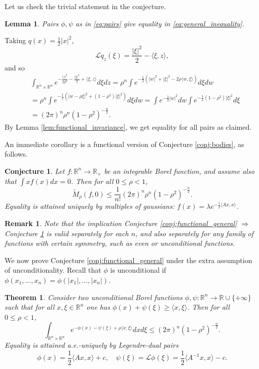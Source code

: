 \documentclass[reqno,10pt]{amsart}
\newcounter{mp}
\newtheorem{Lemma}[Proposition]{Lemma}
\newtheorem{Theorem}[Proposition]{Theorem}
\newtheorem{Remark}[Proposition]{Remark}
\newtheorem{Conjecture}[Proposition]{Conjecture}
\newcommand{\R}{\mathbb{R}}
\begin{document}
Let us check the trivial statement in the conjecture. 
\begin{Lemma}
	Pairs $\phi,\psi$ as in \eqref{eq:pairs} give equality in \eqref{eq:general_inequality}.
\end{Lemma}
\proof 
Taking $q(x)=\frac12 |x|^2$, $$\mathcal Lq_z(\xi)=\frac{|\xi|^2}{2}-\langle \xi,z\rangle,$$ 
and so
\begin{align*}
&\int_{\R^n\times\R^n} e^{-\frac{|z|^2}{2\rho^2}-\frac{|\xi|^2}{2}+\langle \xi, z\rangle}d\xi dz=\rho^n\int e^{-\frac12 (|w|^2+|\xi|^2-2\rho\langle w,\xi\rangle )}d\xi dw
	\\&=\rho^n\int e^{-\frac12 (|w-\rho\xi|^2+(1-\rho^2)|\xi|^2)}d\xi dw =\int e^{-\frac12 |w|^2}dw\int e^{-\frac12 (1-\rho^2)|\xi|^2} d\xi \\&=(2\pi)^n\rho^n(1-\rho^2)^{-\frac{n}{2}}.
\end{align*}
By Lemma \ref{lem:functional_invariance}, we get equality for all pairs as claimed.

\endproof
An immediate corollary is a functional version of Conjecture \ref{conj:bodies}, as follows.
\begin{Conjecture}\label{conj:functional_santalo}
		Let $f:\R^n\to \R_+$ be an integrable Borel function, and assume also that $\int x f(x)dx=0$. Then for all $0\leq \rho<1$,
		\[ \widetilde M_\rho(f,0)\leq \frac{1}{n!}(2\pi)^n\rho^n(1-\rho^2)^{-\frac n 2}. \]
		Equality is attained uniquely by multiples of gaussians: $f(x)=\lambda e^{-\frac 12 \langle Ax, x\rangle}$.
\end{Conjecture}
\begin{Remark}
Note that the implication Conjecture \ref{conj:functional_general} $\Rightarrow$ Conjecture \ref{conj:functional_santalo} is valid separately for each $n$, and also separately for any family of functions with certain symmetry, such as even or unconditional functions.
\end{Remark}

We now prove Conjecture \ref{conj:functional_general} under the extra assumption of unconditionality. Recall that $\phi$ is unconditional if $\phi(x_1,\dots, x_n)=\phi(|x_1|,\dots, |x_n|)$.

\begin{Theorem}\label{thm:functional_unconditional}
	Consider two unconditional Borel functions $\phi,\psi:\R^n\to \R\cup\{+\infty\}$ such that for all $x,\xi\in\R^n$ one has $\phi(x)+\psi(\xi)\geq \langle x, \xi\rangle $. Then for all $0\leq \rho<1$, $$ \int_{\R^n\times\R^n}e^{-\phi(x)-\psi(\xi)+\rho\langle x,\xi\rangle}dxd\xi\leq (2\pi)^n(1-\rho^2)^{-\frac n 2}.$$
	Equality is attained a.e.-uniquely by Legendre-dual pairs $$\phi(x)=\frac 12 \langle Ax, x\rangle +c, \quad \psi(\xi)=\mathcal L\phi(\xi)=\frac 12 \langle A^{-1}x, x\rangle -c.$$
 \end{Theorem}
\end{document}
